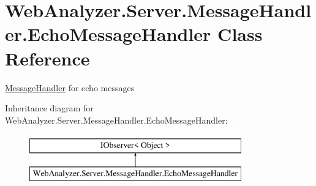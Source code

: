 \hypertarget{class_web_analyzer_1_1_server_1_1_message_handler_1_1_echo_message_handler}{}\section{Web\+Analyzer.\+Server.\+Message\+Handler.\+Echo\+Message\+Handler Class Reference}
\label{class_web_analyzer_1_1_server_1_1_message_handler_1_1_echo_message_handler}


\hyperlink{namespace_web_analyzer_1_1_server_1_1_message_handler}{Message\+Handler} for echo messages  


Inheritance diagram for Web\+Analyzer.\+Server.\+Message\+Handler.\+Echo\+Message\+Handler\+:\begin{figure}[H]
\begin{center}
\leavevmode
\includegraphics[height=2.000000cm]{class_web_analyzer_1_1_server_1_1_message_handler_1_1_echo_message_handler}
\end{center}
\end{figure}
